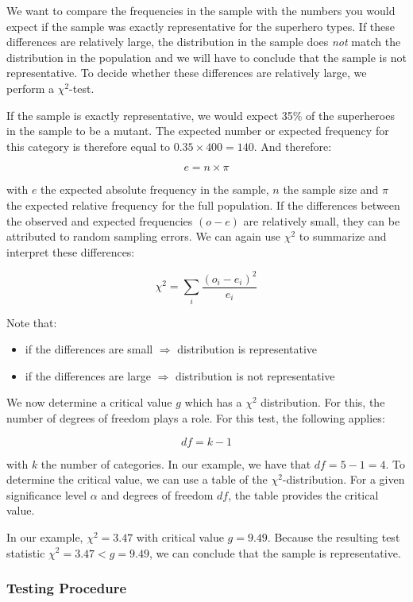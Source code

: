 We want to compare the frequencies in the sample with the numbers you would expect if the sample was exactly representative for the superhero types. If these differences are relatively large, the distribution in the sample does \emph{not} match the distribution in the population and we will have to conclude that the sample is not representative. To decide whether these differences are relatively large, we perform a $\chi^{2}$-test.

If the sample is exactly representative, we would expect 35\% of the superheroes in the sample to be a mutant. The expected number or expected frequency for this category is therefore equal to $0.35 \times 400 = 140$. And therefore:

\[ e = n \times \pi \]

with $e$ the expected absolute frequency in the sample, $n$ the sample size and $\pi$ the expected relative frequency for the full population. If the differences between the observed and expected frequencies $(o - e)$ are relatively small, they can be attributed to random sampling errors. We can again use $\chi^2$ to summarize and interpret these differences:

\[ \chi^{2} = \sum_i \frac{(o_{i} - e_{i})^{2}}{e_{i}} \]

Note that:

\begin{itemize}
  \item if the differences are small $\Rightarrow$ distribution is representative
  \item if the differences are large $\Rightarrow$ distribution is not representative
\end{itemize}

We now determine a critical value $g$ which has a $\chi^{2}$ distribution. For this, the number of degrees of freedom plays a role. For this test, the following applies:

\[ df = k - 1 \]

with $k$ the number of categories. In our example, we have that $df = 5-1 = 4$. To determine the critical value, we can use a table of the $\chi^2$-distribution. For a given significance level $\alpha$ and degrees of freedom $df$, the table provides the critical value.

In our example, $\chi^{2} = 3.47$ with critical value $g = 9.49$. Because the resulting test statistic $\chi^2 = 3.47 < g = 9.49$, we can conclude that the sample is representative.

\subsubsection{Testing Procedure}


